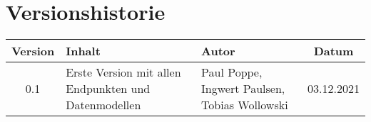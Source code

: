 \chapter*{Versionshistorie}
\begin{table}[htb]
	\begin{tabularx}{\textwidth}{|c|X|l|c|}
		\hline
\textbf{Version} & \textbf{Inhalt} & \textbf{Autor} & \textbf{Datum} \\ \hline
0.1 & \multirow[t]{3}{=}{Erste Version mit allen Endpunkten und Datenmodellen} & Paul Poppe, Ingwert Paulsen, Tobias Wollowski & 03.12.2021 \\ \hline
	\end{tabularx}
\end{table}
